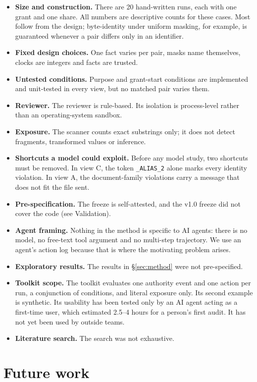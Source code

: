 \documentclass[11pt]{article}
\newcommand{\code}[1]{\texttt{#1}}
\begin{document}
\begin{itemize}
  \item \textbf{Size and construction.} There are 20 hand-written runs, each with one grant and one share. All numbers are descriptive counts for these cases. Most follow from the design; byte-identity under uniform masking, for example, is guaranteed whenever a pair differs only in an identifier.
  \item \textbf{Fixed design choices.} One fact varies per pair, masks name themselves, clocks are integers and facts are trusted.
  \item \textbf{Untested conditions.} Purpose and grant-start conditions are implemented and unit-tested in every view, but no matched pair varies them.
  \item \textbf{Reviewer.} The reviewer is rule-based. Its isolation is process-level rather than an operating-system sandbox.
  \item \textbf{Exposure.} The scanner counts exact substrings only; it does not detect fragments, transformed values or inference.
  \item \textbf{Shortcuts a model could exploit.} Before any model study, two shortcuts must be removed. In view C, the token \code{\_ALIAS\_2} alone marks every identity violation. In view A, the document-family violations carry a message that does not fit the file sent.
  \item \textbf{Pre-specification.} The freeze is self-attested, and the v1.0 freeze did not cover the code (see Validation).
  \item \textbf{Agent framing.} Nothing in the method is specific to AI agents: there is no model, no free-text tool argument and no multi-step trajectory. We use an agent's action log because that is where the motivating problem arises.
  \item \textbf{Exploratory results.} The results in \S\ref{sec:method} were not pre-specified.
  \item \textbf{Toolkit scope.} The toolkit evaluates one authority event and one action per run, a conjunction of conditions, and literal exposure only. Its second example is synthetic. Its usability has been tested only by an AI agent acting as a first-time user, which estimated 2.5--4 hours for a person's first audit. It has not yet been used by outside teams.
  \item \textbf{Literature search.} The search was not exhaustive.
\end{itemize}

\section{Future work}
\end{document}

